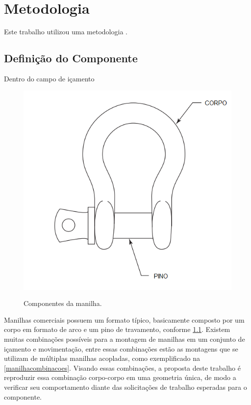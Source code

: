 \chapter{Metodologia} \label{metodologia}

Este trabalho utilizou uma metodologia .

\section{Definição do Componente}

Dentro do campo de içamento 

\begin{figure}[!htb]
   \centering
     \caption{Componentes da manilha.}
    \includegraphics[width=0.45\linewidth]{Figuras/manilhacomponentes.png}\\
    \hspace{1.5cm}\raggedright \fontsize{10}{12}
    \label{manilhacomponentes}
\end{figure}

Manilhas comerciais possuem um formato típico, basicamente composto por um corpo em formato de arco e um pino de travamento, conforme  \ref{manilhacomponentes}. Existem muitas combinações possíveis para a montagem de manilhas em um conjunto de içamento e movimentação, entre essas combinações estão as montagens que se utilizam de múltiplas manilhas acopladas, como exemplificado na  \ref{manilhacombinacoes}. Visando essas combinações, a proposta deste trabalho é reproduzir essa combinação corpo-corpo em uma geometria única, de modo a verificar seu comportamento diante das solicitações de trabalho esperadas para o componente.

